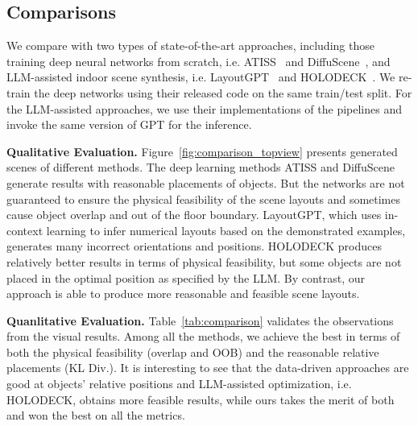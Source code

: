 

\subsection{Comparisons}

We compare with two types of state-of-the-art approaches, including those training deep neural networks from scratch, i.e. ATISS~\cite{Paschalidou2021ATISSAT} and DiffuScene~\cite{Tang2023DiffuSceneSG}, and LLM-assisted indoor scene synthesis, i.e. LayoutGPT~\cite{Feng2023LayoutGPTCV} and HOLODECK~\cite{Yang2023HolodeckLG}. We re-train the deep networks using their released code on the same train/test split. For the LLM-assisted approaches, we use their implementations of the pipelines and invoke the same version of GPT for the inference.

\noindent\textbf{Qualitative Evaluation.} Figure~\ref{fig:comparison_topview} presents generated scenes of different methods. The deep learning methods ATISS and DiffuScene generate results with reasonable placements of objects. But the networks are not guaranteed to ensure the physical feasibility of the scene layouts and sometimes cause object overlap and out of the floor boundary. LayoutGPT, which uses in-context learning to infer numerical layouts based on the demonstrated examples, generates many incorrect orientations and positions. HOLODECK produces relatively better results in terms of physical feasibility, but some objects are not placed in the optimal position as specified by the LLM. By contrast, our approach is able to produce more reasonable and feasible scene layouts.

\noindent\textbf{Quanlitative Evaluation.} Table~\ref{tab:comparison} validates the observations from the visual results. Among all the methods, we achieve the best in terms of both the physical feasibility (overlap and OOB) and the reasonable relative placements (KL Div.). It is interesting to see that the data-driven approaches are good at objects' relative positions and LLM-assisted optimization, i.e. HOLODECK, obtains more feasible results, while ours takes the merit of both and won the best on all the metrics.

